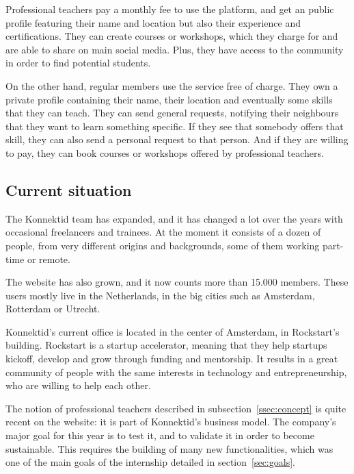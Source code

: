Professional teachers pay a monthly fee to use the platform, and get an public profile featuring their name and location but also their experience and certifications.
They can create courses or workshops, which they charge for and are able to share on main social media.
Plus, they have access to the community in order to find potential students.

On the other hand, regular members use the service free of charge. They own a private profile containing their name, their location and eventually some skills that they can teach.
They can send general requests, notifying their neighbours that they want to learn something specific.
If they see that somebody offers that skill, they can also send a personal request to that person.
And if they are willing to pay, they can book courses or workshops offered by professional teachers.

\subsection{Current situation}
\label{ssec:situation}

The Konnektid team has expanded, and it has changed a lot over the years with occasional freelancers and trainees.
At the moment it consists of a dozen of people, from very different origins and backgrounds, some of them working part-time or remote.

The website has also grown, and it now counts more than 15.000 members.
These users mostly live in the Netherlands, in the big cities such as Amsterdam, Rotterdam or Utrecht.

Konnektid's current office is located in the center of Amsterdam, in Rockstart's building.
Rockstart is a startup accelerator, meaning that they help startups kickoff, develop and grow through funding and mentorship.
It results in a great community of people with the same interests in technology and entrepreneurship, who are willing to help each other.

The notion of professional teachers described in {\sc subsection}~\ref{ssec:concept} is quite recent on the website: it is part of Konnektid's business model.
The company's major goal for this year is to test it, and to validate it in order to become sustainable.
This requires the building of many new functionalities, which was one of the main goals of the internship detailed in {\sc section}~\ref{sec:goals}.
